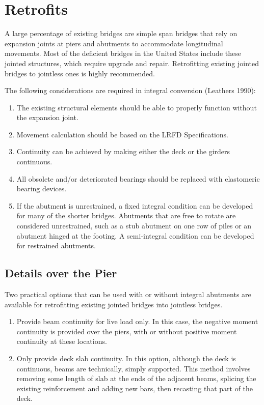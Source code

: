 \section{Retrofits}
A large percentage of existing bridges are simple span bridges that rely on expansion joints at piers and abutments
to accommodate longitudinal movements. Most of the deficient bridges in the United States include these jointed
structures, which require upgrade and repair. Retrofitting existing jointed bridges to jointless ones is highly
recommended.

The following considerations are required in integral conversion (Leathers 1990):
\begin{enumerate}
  \item The existing structural elements should be able to properly function without the expansion joint.
  \item Movement calculation should be based on the LRFD Specifications.
  \item Continuity can be achieved by making either the deck or the girders continuous.
  \item All obsolete and/or deteriorated bearings should be replaced with elastomeric bearing devices.
  \item If the abutment is unrestrained, a fixed integral condition can be developed for many of the shorter bridges. Abutments that are free to rotate are considered unrestrained, such as a stub abutment on one row of piles or an abutment hinged at the footing. A semi-integral condition can be developed for restrained abutments.
\end{enumerate}

\subsection{Details over the Pier}
Two practical options that can be used with or without integral abutments are available for retrofitting existing
jointed bridges into jointless bridges.

\begin{enumerate}
  \item Provide beam continuity for live load only. In this case, the negative moment continuity is provided over the piers, with or without positive moment continuity at these locations.
  \item Only provide deck slab continuity. In this option, although the deck is continuous, beams are technically, simply supported. This method involves removing some length of slab at the ends of the adjacent beams, splicing the existing reinforcement and adding new bars, then recasting that part of the deck.
\end{enumerate}


